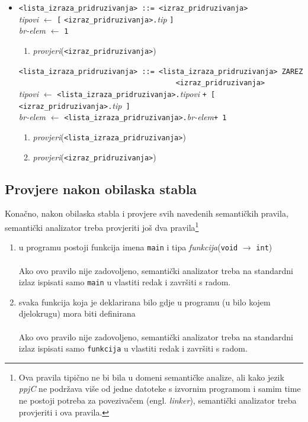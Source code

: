 \documentclass[times, 12pt, utf8]{book}
\begin{document}
\begin{itemize}

\item
\verb|<lista_izraza_pridruzivanja> ::= <izraz_pridruzivanja>|\\
\emph{tipovi} \(\leftarrow\) \verb|[| \verb|<izraz_pridruzivanja>.|\emph{tip} \verb|]|\\
\emph{br-elem} \(\leftarrow\) \verb|1|
\begin{enumerate}
\item
\emph{provjeri}(\verb|<izraz_pridruzivanja>|)
\end{enumerate}

\verb|<lista_izraza_pridruzivanja> ::= <lista_izraza_pridruzivanja> ZAREZ|\\
\verb|                                     <izraz_pridruzivanja>|\\
\emph{tipovi} \(\leftarrow\) \verb|<lista_izraza_pridruzivanja>.|\emph{tipovi} \verb|+ [| \verb|<izraz_pridruzivanja>.|\emph{tip}\verb| ]|\\
\emph{br-elem} \(\leftarrow\) \verb|<lista_izraza_pridruzivanja>.|\emph{br-elem}\verb|+ 1|
\begin{enumerate}
\item
\emph{provjeri}(\verb|<lista_izraza_pridruzivanja>|)
\item
\emph{provjeri}(\verb|<izraz_pridruzivanja>|)
\end{enumerate}

\end{itemize}

\subsection{Provjere nakon obilaska stabla}\label{sec:semantika_after}
Konačno, nakon obilaska stabla i provjere svih navedenih semantičkih pravila, semantički analizator treba provjeriti još dva pravila\footnote{Ova pravila tipično ne bi bila u domeni semantičke analize, ali kako jezik \emph{ppjC} ne podržava više od jedne datoteke s izvornim programom i samim time ne postoji potreba za povezivačem (engl. \emph{linker}), semantički analizator treba provjeriti i ova pravila.}

\begin{enumerate}
\item
u programu postoji funkcija imena \verb|main| i tipa \emph{funkcija}(\verb|void| \(\to\) \verb|int|)\\\\
Ako ovo pravilo nije zadovoljeno, semantički analizator treba na standardni izlaz ispisati samo \verb|main| u vlastiti redak i završiti s radom.
\item
svaka funkcija koja je deklarirana bilo gdje u programu (u bilo kojem djelokrugu) mora biti definirana\\\\
Ako ovo pravilo nije zadovoljeno, semantički analizator treba na standardni izlaz ispisati samo \verb|funkcija| u vlastiti redak i završiti s radom.
\end{enumerate}
\end{document}
